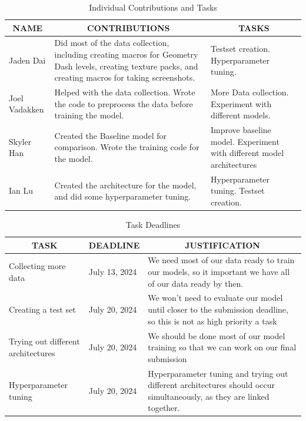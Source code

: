 \documentclass{article} %
\begin{document}
\begin{table}[h]
\caption{Individual Contributions and Tasks}
\label{table:contributions}
\begin{center}
\begin{tabular}{|p{2cm}|p{6cm}|p{6cm}|}
\hline
\multicolumn{1}{|c|}{\bf NAME} & \multicolumn{1}{c|}{\bf CONTRIBUTIONS} & \multicolumn{1}{c|}{\bf TASKS}\\ \hline
Jaden Dai & Did most of the data collection, including creating macros for Geometry Dash levels, creating texture packs, and creating macros for taking screenshots. & Testset creation. Hyperparameter tuning.\\ \hline
Joel Vadakken & Helped with the data collection. Wrote the code to preprocess the data before training the model. & More Data collection. Experiment with different models.\\ \hline
Skyler Han & Created the Baseline model for comparison. Wrote the training code for the model. & Improve baseline model. Experiment with different model architectures\\ \hline 
Ian Lu & Created the architecture for the model, and did some hyperparameter tuning. & Hyperparameter tuning. Testset creation. \\ \hline
\end{tabular}
\end{center}
\end{table}


\begin{table}[h]
\caption{Task Deadlines}
\label{table:task deadlines}
\begin{center}
\begin{tabular}{|p{3cm}|p{3cm}|p{6cm}|}
\hline
\multicolumn{1}{|c|}{\bf TASK} & \multicolumn{1}{c|}{\bf DEADLINE} & \multicolumn{1}{c|}{\bf JUSTIFICATION}\\ \hline
Collecting more data & July 13, 2024 & We need most of our data ready to train our models, so it important we have all of our data ready by then. \\ \hline 
Creating a test set & July 20, 2024 & We won't need to evaluate our model until closer to the submission deadline, so this is not as high priority a task \\ \hline 
Trying out different architectures & July 20, 2024 & We should be done most of our model training so that we can work on our final submission \\ \hline
Hyperparameter tuning & July 20, 2024 & Hyperparameter tuning and trying out different architectures should occur simultaneously, as they are linked together. \\ \hline
\end{tabular}
\end{center}
\end{table}
\end{document}
